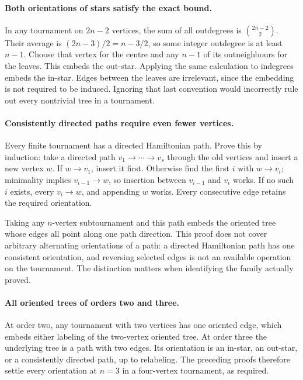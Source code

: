 \documentclass[11pt,a4paper]{article}
\begin{document}
\paragraph{Both orientations of stars satisfy the exact bound.}
In any tournament on $2n-2$ vertices, the sum of all outdegrees is
$\binom{2n-2}{2}$. Their average is $(2n-3)/2=n-3/2$, so some
integer outdegree is at least $n-1$. Choose that vertex for the centre
and any $n-1$ of its outneighbours for the leaves. This embeds the
out-star. Applying the same calculation to indegrees embeds the
in-star. Edges between the leaves are irrelevant, since the embedding
is not required to be induced. Ignoring that last convention would
incorrectly rule out every nontrivial tree in a tournament.

\paragraph{Consistently directed paths require even fewer vertices.}
Every finite tournament has a directed Hamiltonian path. Prove this by
induction: take a directed path $v_1\to\cdots\to v_s$ through the
old vertices and insert a new vertex $w$. If $w\to v_1$, insert it
first. Otherwise find the first $i$ with $w\to v_i$; minimality
implies $v_{i-1}\to w$, so insertion between $v_{i-1}$ and $v_i$
works. If no such $i$ exists, every $v_i\to w$, and appending $w$
works. Every consecutive edge retains the required orientation.

Taking any $n$-vertex subtournament and this path embeds the oriented
tree whose edges all point along one path direction. This proof does
not cover arbitrary alternating orientations of a path: a directed
Hamiltonian path has one consistent orientation, and reversing selected
edges is not an available operation on the tournament. The distinction
matters when identifying the family actually proved.

\paragraph{All oriented trees of orders two and three.}
At order two, any tournament with two vertices has one oriented edge,
which embeds either labeling of the two-vertex oriented tree. At order
three the underlying tree is a path with two edges. Its orientation
is an in-star, an out-star, or a consistently directed path, up to
relabeling. The preceding proofs therefore settle every orientation at
$n=3$ in a four-vertex tournament, as required.
\end{document}
